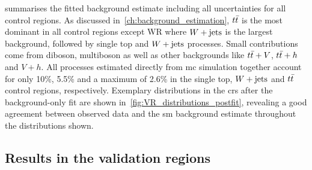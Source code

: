  summarises the fitted background estimate including all uncertainties for all control regions. As discussed in~\cref{ch:background_estimation}, $t\bar{t}$ is the most dominant in all control regions except WR where $W+\mathrm{jets}$ is the largest background, followed by single top and $W+\mathrm{jets}$ processes. Small contributions come from diboson, multiboson as well as other backgrounds like $t\bar{t}+V$, $t\bar{t}+h$ and $V+h$. All processes estimated directly from \gls{mc} simulation together account for only 10\%, 5.5\% and a maximum of 2.6\% in the single top, $W+\mathrm{jets}$ and $t\bar{t}$ control regions, respectively. Exemplary distributions in the \glspl{cr} after the background-only fit are shown in~\cref{fig:VR_distributions_postfit}, revealing a good agreement between observed data and the \gls{sm} background estimate throughout the distributions shown.




\subsection{Results in the validation regions}



